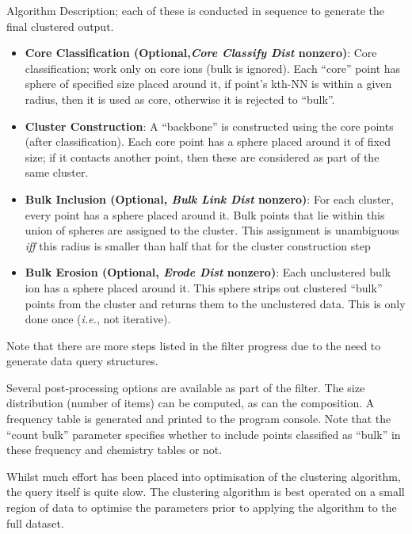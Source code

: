 \documentclass[10pt]{article}
\begin{document}
Algorithm Description; each of these is conducted in sequence to generate the final clustered output.
\begin{itemize}
 \item \textbf{Core Classification (Optional,\emph{Core Classify Dist} nonzero)}: Core classification; work only on core ions (bulk is ignored). Each ``core'' point has sphere of specified size placed around it, if point's kth-NN is within a given radius, then it is used as core, otherwise it is rejected to ``bulk''.

 \item \textbf{Cluster Construction}: A ``backbone'' is constructed using the core points (after classification). Each core point has a sphere placed around it of fixed size; if it  contacts another point, then these are considered as part of the same cluster.
 \item \textbf{Bulk Inclusion (Optional, \emph{Bulk Link Dist} nonzero)}: For each cluster, every point has a sphere placed around it. Bulk points that lie within this union of spheres are assigned to the cluster. This assignment is unambiguous \emph{iff} this radius is smaller than half that for the cluster construction step
 \item \textbf{Bulk Erosion (Optional, \emph{Erode Dist} nonzero)}: Each unclustered bulk ion has a sphere placed around it. This sphere strips out clustered ``bulk'' points from the cluster and returns them to the unclustered data. This is only done once (\emph{i.e.}, not iterative).
\end{itemize}

Note that there are more steps listed in the filter progress due to the need to generate data query structures.

Several post-processing options are available as part of the filter. The size distribution (number of items) can be computed, as can the composition. A frequency table is generated and printed to the program console. Note that the ``count bulk'' parameter specifies whether to include points classified as ``bulk'' in these frequency and chemistry tables or not.

Whilst much effort has been placed into optimisation of the clustering algorithm, the query itself is quite slow. The clustering algorithm is best operated on a small region of data to optimise the parameters prior to applying the algorithm to the full dataset.
\end{document}
